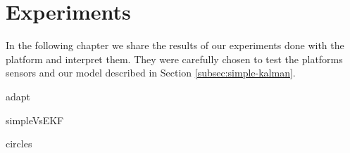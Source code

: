 \documentclass[class=article, crop=false]{standalone}
\begin{document}
\chapter{Experiments}\label{cha:exp}

In the following chapter we share the results of our experiments done with the platform and interpret them. They were carefully chosen to test the platforms sensors and our model described in Section \ref{subsec:simple-kalman}.

{adapt}

{simpleVsEKF}

{circles}
\end{document}
